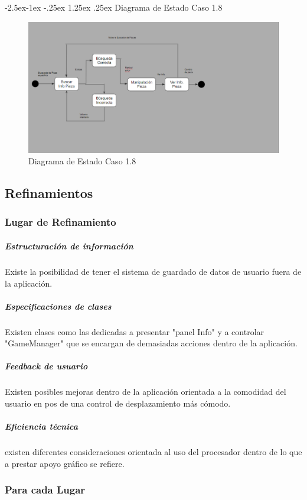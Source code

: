\documentclass[12pt]{article}
\makeatletter
\renewcommand\paragraph{\@startsection{paragraph}{4}{\z@}%
	{-2.5ex\@plus -1ex \@minus -.25ex}%
	{1.25ex \@plus .25ex}%
	{\normalfont\normalsize\bfseries}}
\makeatother
\begin{document}
\paragraph{Diagrama de Estado Caso 1.8}

\begin{figure}[H]
\centerline{\includegraphics[width=15cm]{imgs/Estados_8.png}}
\caption{Diagrama de Estado Caso 1.8}
\label{fig_E_8}
\end{figure}

\subsection{Refinamientos}

\subsubsection{Lugar de Refinamiento}

\subparagraph{Estructuración de información}
Existe la posibilidad de tener el sistema de guardado de datos de usuario fuera de la aplicación.

\subparagraph{Especificaciones de clases}
Existen clases como las dedicadas a presentar "panel Info" y a controlar "GameManager" que se encargan de demasiadas acciones dentro de la aplicación.

\subparagraph{Feedback de usuario}
Existen posibles mejoras dentro de la aplicación orientada a la comodidad del usuario en pos de una control de desplazamiento más cómodo.

\subparagraph{Eficiencia técnica}
existen diferentes consideraciones orientada al uso del procesador dentro de lo que a prestar apoyo gráfico se refiere.


\subsubsection{Para cada Lugar}
\end{document}
